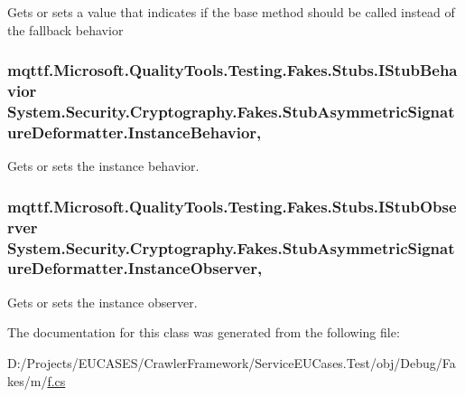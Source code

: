Gets or sets a value that indicates if the base method should be called instead of the fallback behavior

\hypertarget{class_system_1_1_security_1_1_cryptography_1_1_fakes_1_1_stub_asymmetric_signature_deformatter_a2b1c4f81c790a4a74f2b05dca70a7e00}{
\subsubsection[{Instance\-Behavior}]{\setlength{\rightskip}{0pt plus 5cm}mqttf.\-Microsoft.\-Quality\-Tools.\-Testing.\-Fakes.\-Stubs.\-I\-Stub\-Behavior System.\-Security.\-Cryptography.\-Fakes.\-Stub\-Asymmetric\-Signature\-Deformatter.\-Instance\-Behavior\hspace{0.3cm}{\ttfamily [get]}, {\ttfamily [set]}}}\label{class_system_1_1_security_1_1_cryptography_1_1_fakes_1_1_stub_asymmetric_signature_deformatter_a2b1c4f81c790a4a74f2b05dca70a7e00}


Gets or sets the instance behavior.

\hypertarget{class_system_1_1_security_1_1_cryptography_1_1_fakes_1_1_stub_asymmetric_signature_deformatter_a556847b758ad0ce50f79942bb6dd6337}{
\subsubsection[{Instance\-Observer}]{\setlength{\rightskip}{0pt plus 5cm}mqttf.\-Microsoft.\-Quality\-Tools.\-Testing.\-Fakes.\-Stubs.\-I\-Stub\-Observer System.\-Security.\-Cryptography.\-Fakes.\-Stub\-Asymmetric\-Signature\-Deformatter.\-Instance\-Observer\hspace{0.3cm}{\ttfamily [get]}, {\ttfamily [set]}}}\label{class_system_1_1_security_1_1_cryptography_1_1_fakes_1_1_stub_asymmetric_signature_deformatter_a556847b758ad0ce50f79942bb6dd6337}


Gets or sets the instance observer.



The documentation for this class was generated from the following file\-:\begin{DoxyCompactItemize}
\item 
D\-:/\-Projects/\-E\-U\-C\-A\-S\-E\-S/\-Crawler\-Framework/\-Service\-E\-U\-Cases.\-Test/obj/\-Debug/\-Fakes/m/\hyperlink{m_2f_8cs}{f.\-cs}\end{DoxyCompactItemize}
